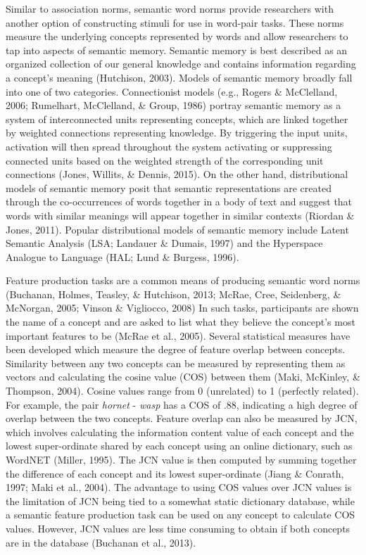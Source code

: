 \documentclass[english,,man]{apa6}
\begin{document}
Similar to association norms, semantic word norms provide researchers
with another option of constructing stimuli for use in word-pair tasks.
These norms measure the underlying concepts represented by words and
allow researchers to tap into aspects of semantic memory. Semantic
memory is best described as an organized collection of our general
knowledge and contains information regarding a concept's meaning
(Hutchison, 2003). Models of semantic memory broadly fall into one of
two categories. Connectionist models (e.g., Rogers \& McClelland, 2006;
Rumelhart, McClelland, \& Group, 1986) portray semantic memory as a
system of interconnected units representing concepts, which are linked
together by weighted connections representing knowledge. By triggering
the input units, activation will then spread throughout the system
activating or suppressing connected units based on the weighted strength
of the corresponding unit connections (Jones, Willits, \& Dennis, 2015).
On the other hand, distributional models of semantic memory posit that
semantic representations are created through the co-occurrences of words
together in a body of text and suggest that words with similar meanings
will appear together in similar contexts (Riordan \& Jones, 2011).
Popular distributional models of semantic memory include Latent Semantic
Analysis (LSA; Landauer \& Dumais, 1997) and the Hyperspace Analogue to
Language (HAL; Lund \& Burgess, 1996).

Feature production tasks are a common means of producing semantic word
norms (Buchanan, Holmes, Teasley, \& Hutchison, 2013; McRae, Cree,
Seidenberg, \& McNorgan, 2005; Vinson \& Vigliocco, 2008) In such tasks,
participants are shown the name of a concept and are asked to list what
they believe the concept's most important features to be (McRae et al.,
2005). Several statistical measures have been developed which measure
the degree of feature overlap between concepts. Similarity between any
two concepts can be measured by representing them as vectors and
calculating the cosine value (COS) between them (Maki, McKinley, \&
Thompson, 2004). Cosine values range from 0 (unrelated) to 1 (perfectly
related). For example, the pair \emph{hornet} - \emph{wasp} has a COS of
.88, indicating a high degree of overlap between the two concepts.
Feature overlap can also be measured by JCN, which involves calculating
the information content value of each concept and the lowest
super-ordinate shared by each concept using an online dictionary, such
as WordNET (Miller, 1995). The JCN value is then computed by summing
together the difference of each concept and its lowest super-ordinate
(Jiang \& Conrath, 1997; Maki et al., 2004). The advantage to using COS
values over JCN values is the limitation of JCN being tied to a somewhat
static dictionary database, while a semantic feature production task can
be used on any concept to calculate COS values. However, JCN values are
less time consuming to obtain if both concepts are in the database
(Buchanan et al., 2013).
\end{document}
